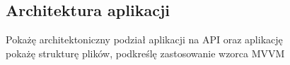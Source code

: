 \subsection{Architektura aplikacji}

Pokażę architektoniczny podział aplikacji na API oraz aplikację\\
pokażę strukturę plików, podkreślę zastosowanie wzorca MVVM